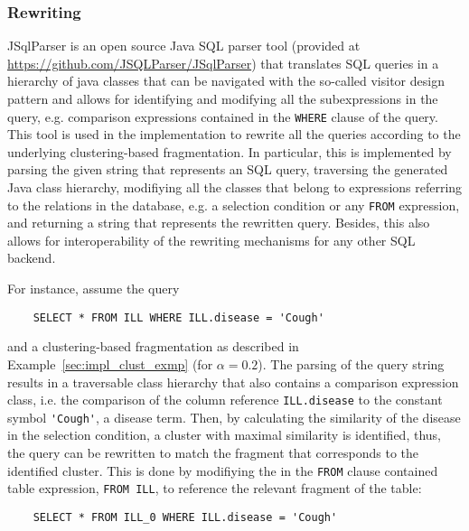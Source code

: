 \subsubsection{Rewriting}
\label{sec:impl_qpro_rewr}

JSqlParser is an open source Java SQL parser tool (provided at \url{https://github.com/JSQLParser/JSqlParser}) that translates SQL queries in a hierarchy 
of java classes that can be navigated with the so-called visitor design pattern \cite[pp.~331ff.]{Gamma1994} and allows for identifying and modifying all the
subexpressions in the query, e.g. comparison expressions contained in the \verb!WHERE! clause of the query. This tool is used in the implementation 
to rewrite all the queries according to the underlying clustering-based fragmentation. In particular, this is implemented by parsing the given string that 
represents an SQL query, traversing the generated Java class hierarchy, modifiying all the classes that belong to expressions referring to the relations in
the database, e.g. a selection condition or any \verb!FROM! expression, and returning a string that represents the rewritten query. Besides, this also allows
for interoperability of the rewriting mechanisms for any other SQL backend. 

\begin{exmp}
\label{sec:impl_qpro_exmp}
For instance, assume the query
\begin{verbatim}
    SELECT * FROM ILL WHERE ILL.disease = 'Cough'
\end{verbatim}
and a clustering-based fragmentation as described in Example~\ref{sec:impl_clust_exmp} (for $\alpha=0.2$). The parsing of the query string results in a 
traversable class hierarchy that also contains a comparison expression class, i.e. the comparison of the column reference \verb!ILL.disease! to the constant 
symbol \verb!'Cough'!, a disease term. Then, by calculating the similarity of the disease in the selection condition, a cluster with maximal similarity is
identified, thus, the query can be rewritten to match the fragment that corresponds to the identified cluster. This is done by modifiying the in the 
\verb!FROM! clause contained table expression, \verb!FROM ILL!, to reference the relevant fragment of the table:
\begin{verbatim}
    SELECT * FROM ILL_0 WHERE ILL.disease = 'Cough'
\end{verbatim}
\end{exmp}

